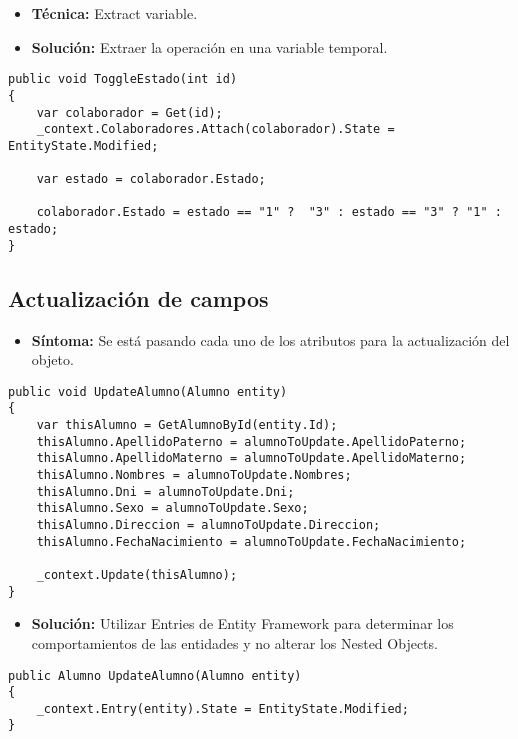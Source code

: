 \begin{itemize}	
	\item \textbf{Técnica:} Extract variable.
	\item \textbf{Solución:} Extraer la operación en una variable temporal.
\end{itemize}

\begin{lstlisting}[language={[Sharp]C}]
public void ToggleEstado(int id)
{
	var colaborador = Get(id);
	_context.Colaboradores.Attach(colaborador).State = EntityState.Modified;
	
	var estado = colaborador.Estado;
	
	colaborador.Estado = estado == "1" ?  "3" : estado == "3" ? "1" : estado;
}
\end{lstlisting}


\subsection{Actualización de campos}
\begin{itemize}
	\item \textbf{Síntoma:} Se está pasando cada uno de los atributos para la actualización del objeto.
\end{itemize}

\begin{lstlisting}[language={[Sharp]C}]
public void UpdateAlumno(Alumno entity)
{
	var thisAlumno = GetAlumnoById(entity.Id);
	thisAlumno.ApellidoPaterno = alumnoToUpdate.ApellidoPaterno;
	thisAlumno.ApellidoMaterno = alumnoToUpdate.ApellidoMaterno;
	thisAlumno.Nombres = alumnoToUpdate.Nombres;
	thisAlumno.Dni = alumnoToUpdate.Dni;
	thisAlumno.Sexo = alumnoToUpdate.Sexo;
	thisAlumno.Direccion = alumnoToUpdate.Direccion;
	thisAlumno.FechaNacimiento = alumnoToUpdate.FechaNacimiento;
	
	_context.Update(thisAlumno);
}
\end{lstlisting}

\begin{itemize}
	\item \textbf{Solución:} Utilizar Entries de Entity Framework para determinar los comportamientos de las entidades y no alterar los Nested Objects.
\end{itemize}

\begin{lstlisting}[language={[Sharp]C}]
public Alumno UpdateAlumno(Alumno entity)
{
	_context.Entry(entity).State = EntityState.Modified;
}
\end{lstlisting}

